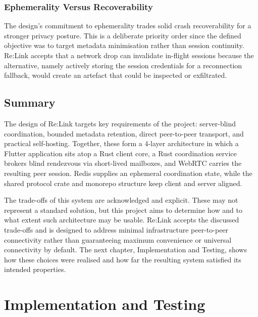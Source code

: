 \documentclass[12pt,a4paper,oneside]{report}
\begin{document}
\subsection{Ephemerality Versus Recoverability}
\label{sec:ephemerality-vs-recoverability}

The design's commitment to ephemerality trades solid crash recoverability for a stronger privacy posture. This is a deliberate priority order since the defined objective was to target metadata minimisation rather than session continuity. Re:Link accepts that a network drop can invalidate in-flight sessions because the alternative, namely actively storing the session credentials for a reconnection fallback, would create an artefact that could be inspected or exfiltrated.


\section{Summary}
\label{sec:design-summary}

The design of Re:Link targets key requirements of the project: server-blind coordination, bounded metadata retention, direct peer-to-peer transport, and practical self-hosting. Together, these form a 4-layer architecture in which a Flutter application sits atop a Rust client core, a Rust coordination service brokers blind rendezvous via short-lived mailboxes, and WebRTC carries the resulting peer session. Redis supplies an ephemeral coordination state, while the shared protocol crate and monorepo structure keep client and server aligned.

The trade-offs of this system are acknowledged and explicit. These may not represent a standard solution, but this project aims to determine how and to what extent such architecture may be usable. Re:Link accepts the discussed trade-offs and is designed to address minimal infrastructure peer-to-peer connectivity rather than guaranteeing maximum convenience or universal connectivity by default. The next chapter, Implementation and Testing, shows how these choices were realised and how far the resulting system satisfied its intended properties.


\chapter{Implementation and Testing}
\label{ch:implementation}
\end{document}
